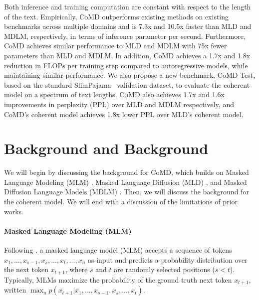 \documentclass{article} %
\newcommand{\ours}{\textsc{CoMD}\xspace}
\begin{document}
Both inference and training computation are constant with respect to the length of the text. Empirically, CoMD outperforms existing methods on existing benchmarks across multiple domains and is 7.3x and 10.5x faster than MLD and MDLM, respectively, in terms of inference parameter per second. Furthermore, CoMD achieves similar performance to MLD and MDLM with 75x fewer parameters than MLD and MDLM. In addition, CoMD achieves a 1.7x and 1.8x reduction in FLOPs per training step compared to autoregressive models, while maintaining similar performance. We also propose a new benchmark, CoMD Test, based on the standard SlimPajama~\citep{soboleva2023slimpajama} validation dataset, to evaluate the coherent model on a spectrum of text lengths. \ours also achieves 1.7x and 1.6x improvements in perplexity (PPL) over MLD and MDLM respectively, and CoMD's coherent model achieves 1.8x lower PPL over MLD's coherent model. 



\section{Background and Background}

We will begin by discussing the background for CoMD, which builds on Masked Language Modeling (MLM) \citep{devlin-etal-2019-bert}, Masked Language Diffusion (MLD) \citep{austin2023structured}, and Masked Diffusion Language Models (MDLM) \citep{austin2023structured, shih2022training, austin2023structured, liu2024copula}. Then, we will discuss the background for the coherent model. We will end with a discussion of the limitations of prior works.

\paragraph{Masked Language Modeling (MLM)} Following \citet{devlin-etal-2019-bert}, a masked language model (MLM) accepts a sequence of tokens $x_1, ..., x_{s-1}, x_s, ..., x_t, ..., x_n$ as input and predicts a probability distribution over the next token $x_{t+1}$, where $s$ and $t$ are randomly selected positions ($s < t$). Typically, MLMs maximize the probability of the ground truth next token $x_{t+1}$, written $\max_n p(x_{t+1} | x_1, ..., x_{s-1}, x_s, ..., x_t)$.
\end{document}
